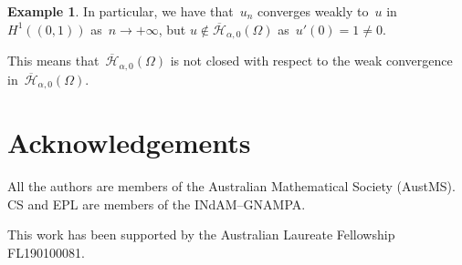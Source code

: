 \documentclass[12pt,a4paper,intlimits,sumlimits]{amsart}
\theoremstyle{definition}
\newtheorem{example}[definition]{Example}
\theoremstyle{plain}
\numberwithin{equation}{section}
\begin{document}
\begin{appendix}
\begin{example}
In particular, we have that~$u_n$ converges weakly to~$u$ in~$H^1((0,1))$ as~$n\to+\infty$,
but $u\not \in \overline{\mathcal H}_{\alpha, 0}(\Omega)$ as~$u'(0)=1\neq 0$.

This means that~$\overline{\mathcal H}_{\alpha, 0}(\Omega)$ is not closed with respect to the weak convergence in~$\overline{\mathcal H}_{\alpha, 0}(\Omega)$.
\end{example}

\end{appendix}

\section*{Acknowledgements} 
All the authors are members of the Australian Mathematical Society (AustMS). CS and EPL are members of the INdAM--GNAMPA.

This work has been supported by the Australian Laureate Fellowship FL190100081.
\end{document}
